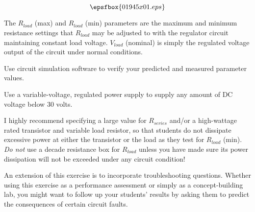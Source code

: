 

$$\epsfbox{01945x01.eps}$$

The $R_{load}$ (max) and $R_{load}$ (min) parameters are the maximum and minimum resistance settings that $R_{load}$ may be adjusted to with the regulator circuit maintaining constant load voltage.  $V_{load}$ (nominal) is simply the regulated voltage output of the circuit under normal conditions.

\vfil \eject






Use circuit simulation software to verify your predicted and measured parameter values.







Use a variable-voltage, regulated power supply to supply any amount of DC voltage below 30 volts.

I highly recommend specifying a large value for $R_{series}$ and/or a high-wattage rated transistor and variable load resistor, so that students do not dissipate excessive power at either the transistor or the load as they test for $R_{load}$ (min).  {\it Do not} use a decade resistance box for $R_{load}$ unless you have made sure its power dissipation will not be exceeded under any circuit condition!

An extension of this exercise is to incorporate troubleshooting questions.  Whether using this exercise as a performance assessment or simply as a concept-building lab, you might want to follow up your students' results by asking them to predict the consequences of certain circuit faults.




